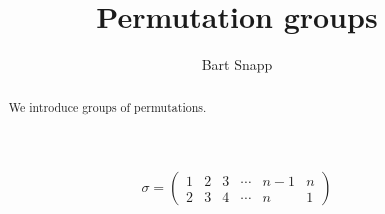 \documentclass{ximera}
\author{Bart Snapp}
\title{Permutation groups}
\begin{document}
\begin{abstract}
  We introduce groups of permutations. 
\end{abstract}
\maketitle


\[
  \sigma = \left(\begin{smallmatrix}
    1 & 2 & 3 & \cdots & n-1 & n \\
    2 & 3 & 4 & \cdots &  n  & 1
  \end{smallmatrix}\right)
\]
\end{document}
